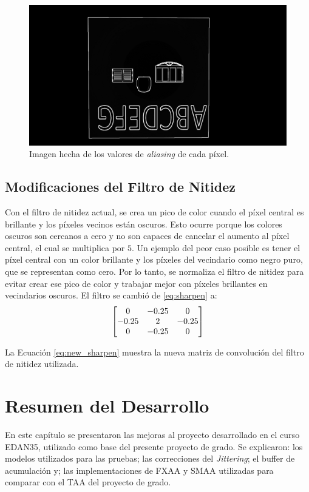 \documentclass[pregrado]{tesis-usb} %
\begin{document}
\begin{figure}[H]
	\centering
	\includegraphics[scale=0.2]{images/aliased_value_example_3_temporal.png}
	\caption{Imagen hecha de los valores de \textit{aliasing} de cada píxel.}\label{fig:aliasedval3}
\end{figure}

\subsection{Modificaciones del Filtro de Nitidez}
Con el filtro de nitidez actual, se crea un pico de color cuando el píxel central es brillante y los píxeles vecinos están oscuros. Esto ocurre porque los colores oscuros son cercanos a cero y no son capaces de cancelar el aumento al píxel central, el cual se multiplica por $5$. Un ejemplo del peor caso posible es tener el píxel central con un color brillante y los píxeles del vecindario como negro puro, que se representan como cero. Por lo tanto, se normaliza el filtro de nitidez para evitar crear ese pico de color y trabajar mejor con píxeles brillantes en vecindarios oscuros. El filtro se cambió de \ref{eq:sharpen} a:
\begin{equation} \label{eq:new_sharpen}
\centering
\begin{bmatrix*}[c]
0 & -0.25 &  0 \\
-0.25  &  2 & -0.25  \\
0 & -0.25  &  0
\end{bmatrix*}
\end{equation}

La Ecuación \ref{eq:new_sharpen} muestra la nueva matriz de convolución del filtro de nitidez utilizada.

\section{Resumen del Desarrollo}
En este capítulo se presentaron las mejoras al proyecto desarrollado en el curso EDAN35, utilizado como base del presente proyecto de grado. Se explicaron: los modelos utilizados para las pruebas; las correcciones del \textit{Jittering}; el buffer de acumulación y; las implementaciones de FXAA y SMAA utilizadas para comparar con el TAA del proyecto de grado.  
\end{document}
